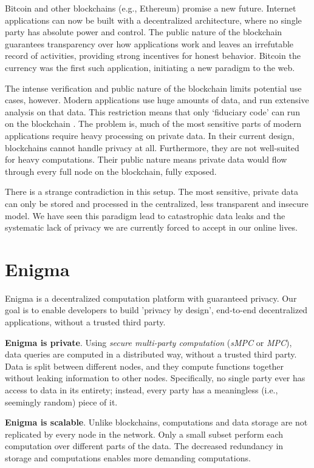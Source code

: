 \documentclass{article} \usepackage{nips13submit_e,times}
\begin{document}
Bitcoin \cite{nakamoto} and other blockchains \cite{crypto15} (e.g., Ethereum) promise a new future. Internet applications can now be built with a decentralized architecture, where no single party has absolute power and control. The public nature of the blockchain guarantees transparency over how applications work and leaves an irrefutable record of activities, providing strong incentives for honest behavior. Bitcoin the currency was the first such application, initiating a new paradigm to the web.

The intense verification and public nature of the blockchain limits potential use cases, however. Modern applications use huge amounts of data, and run extensive analysis on that data. This restriction means that only ‘fiduciary code’ can run on the blockchain \cite{intro7}. The problem is, much of the most sensitive parts of modern applications require heavy processing on private data. In their current design, blockchains cannot handle privacy at all. Furthermore, they are not well-suited for heavy computations. Their public nature means private data would flow through every full node on the blockchain, fully exposed. 
  
There is a strange contradiction in this setup. The most sensitive, private data can only be stored and processed in the centralized, less transparent and insecure model. We have seen this paradigm lead to catastrophic data leaks and the systematic lack of privacy we are currently forced to accept in our online lives.

\section{Enigma}

Enigma is a decentralized computation platform with guaranteed privacy. Our goal is to enable developers to build 'privacy by design', end-to-end decentralized applications, without a trusted third party. 

\textbf{Enigma is private}. Using \textit{secure multi-party computation} (\textit{sMPC} or \textit{MPC}), data queries are computed in a distributed way, without a trusted third party. Data is split between different nodes, and they compute functions together without leaking information to other nodes. Specifically, no single party ever has access to data in its entirety; instead, every party has a meaningless (i.e., seemingly random) piece of it.

\textbf{Enigma is scalable}. Unlike blockchains, computations and data storage are not replicated by every node in the network. Only a small subset perform each computation over different parts of the data. The decreased redundancy in storage and computations enables more demanding computations.
\end{document}
